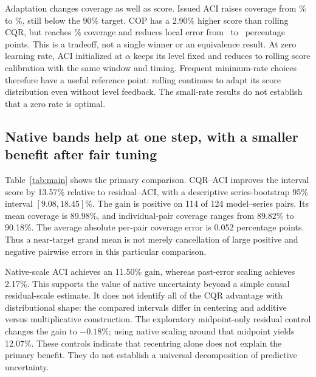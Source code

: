 \documentclass[preprint,11pt]{elsarticle}
\begin{document}
Adaptation changes coverage as well as score. Issued ACI raises coverage from
\RollingCoverage\% to \IssuedCoverage\%, still below the 90\% target. COP has a
2.90\% higher score than rolling CQR, but reaches \COPCoverage\% coverage and reduces
local error from \RollingLocal\ to \COPLocal\ percentage points. This is a tradeoff,
not a single winner or an equivalence result. At zero learning rate, ACI initialized
at $\alpha$ keeps its level fixed and reduces to rolling score calibration with the
same window and timing. Frequent minimum-rate choices therefore have a useful
reference point: rolling continues to adapt its score distribution even without
level feedback. The small-rate results do not establish that a zero rate is optimal.

\subsection{Native bands help at one step, with a smaller benefit after fair tuning}
Table~\ref{tab:main} shows the primary comparison. CQR--ACI improves the interval score
by 13.57\% relative to residual--ACI, with a descriptive series-bootstrap 95\% interval
$[9.08,18.45]\%$. The gain is positive on 114 of 124 model--series pairs. Its mean
coverage is 89.98\%, and individual-pair coverage ranges from 89.82\% to 90.18\%.
The average absolute per-pair coverage error is 0.052 percentage points. Thus a near-target
grand mean is not merely cancellation of large positive and negative pairwise errors in
this particular comparison.

\begin{table}[htbp]\centering\small
\caption{Main panel at a 90\% target. Gain is relative to default residual--ACI.
Gap is the mean absolute pairwise coverage error; Local is the mean 150-origin coverage
error. FACI, SAOCP, SF-OGD and PI-log refer to the declared adaptations.}
\label{tab:main}
\end{table}

Native-scale ACI achieves an 11.50\% gain, whereas past-error scaling achieves 2.17\%.
This supports the value of native uncertainty beyond a simple causal residual-scale
estimate. It does not identify all of the CQR advantage with distributional shape:
the compared intervals differ in centering and additive versus multiplicative construction.
The exploratory midpoint-only residual control changes the gain to $-0.18\%$; using
native scaling around that midpoint yields 12.07\%. These controls indicate that
recentring alone does not explain the primary benefit. They do not establish a universal
decomposition of predictive uncertainty.
\end{document}
